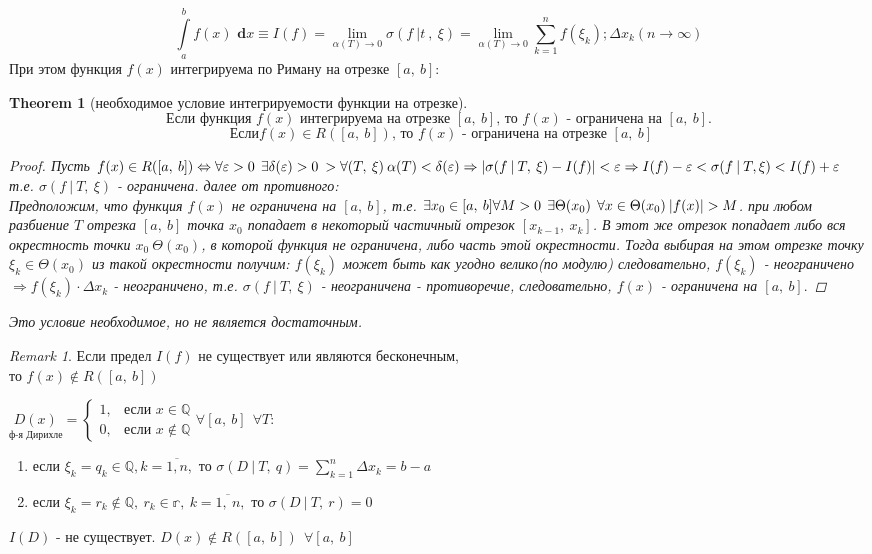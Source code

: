 \documentclass[a4paper,12pt, centered]{bookest}
\newtheorem{theorem}{Theorem}[section]
\theoremstyle{remark}
\newtheorem*{remark}{Remark}
\newcommand\dx{\textbf{ d}x}
\begin{document}
$$\int\limits_a^b f(x)\dx\equiv I(f)=\lim_{\alpha(T)\to0}\sigma(f\>|t\>,\>\xi)=\lim_{\alpha(T)\to0}\sum\limits_{k=1}^n f(\xi_k);\Delta x_k(n\to\infty)$$
При этом функция $f(x)$ интегрируема по Риману на отрезке $[a,\>b]:$
\begin{theorem}[необходимое условие интегрируемости функции на отрезке]
	$$\textrm{Если функция }f(x)\textrm{ интегрируема на отрезке }[a,\>b]\textrm{, то }f(x)\textrm{ - ограничена на }[a,\>b].$$
	$$\textrm{ Если}f(x)\in R([a,\>b])\textrm{, то }f(x)\textrm{ - ограничена на отрезке }[a,\>b]$$
	\begin{proof}
		Пусть $f(x)\in R([a,\>b])\Leftrightarrow\forall\varepsilon>0\>\>\exists\delta(\varepsilon)>0\>>\forall (T,\>\xi)\>\alpha (T)<\delta(\varepsilon)\Rightarrow|\sigma(f\>|\>T,\>\xi)-I(f)|<\varepsilon\Rightarrow I(f)-\varepsilon <\sigma(f\>|\>T,\xi)<I(f)+\varepsilon \\$ т.е. $\sigma(f\>|\>T,\>\xi)$ - ограничена. далее от противного: \\ Предположим, что функция $f(x)$ не ограничена на $[a,\>b]$, т.е. $\exists x_0\in[a,\>b]\\\forall M>0\>\>\exists\Theta(x_0)\>\>\forall x\in\Theta(x_0)\>|f(x)|>M$. при любом разбиение $T$ отрезка $[a,\>b]$ точка $x_0$ попадает в некоторый частичный отрезок $[x_{k-1},\>x_k]$. В этот же отрезок попадает либо вся окрестность точки $x_0\>\Theta(x_0)$, в которой функция не ограничена, либо часть этой окрестности. Тогда выбирая на этом отрезке точку $\xi_k\in\Theta(x_0)$  из такой окрестности получим: $f(\xi_k)$ может быть как угодно велико(по модулю) следовательно, $f(\xi_k)$ - неограничено $\Rightarrow f(\xi_k)\cdot\Delta x_k$ - неограничено, т.е. $\sigma(f\>|\>T,\>\xi)$ - неограничена - противоречие, следовательно, $f(x)$ - ограничена на $[a,\>b].$
	\end{proof}
	Это условие необходимое, но не является достаточным.
\end{theorem}
\begin{remark}
	Если предел $I(f)$ не существует или являются бесконечным, \\то $f(x)\not\in R([a,\>b])$
\end{remark}
\begin{example}
	$\underset{\textrm{ф-я Дирихле}}{D(x)}=\left\{\begin{array}{rl}
		1, & \textrm{если } x\in\mathbb{Q}\\
		0, & \textrm{если } x\not\in\mathbb{Q}
	\end{array}\right.$\newpage $\forall [a,\>b]\>\>\forall T:$\begin{enumerate}
		\item если $\xi_k=q_k\in\mathbb{Q},k=\overline{1,n},$ то $\sigma(D\>|\>T,\>q)=\sum\limits_{k=1}^n\Delta x_k=b-a$
		\item если $\xi_k=r_k\not\in\mathbb{Q},\>r_k\in\mathbb{r},\>k=\overline{1,\>n},$ то $\sigma(D\>|\>T,\>r)=0$
	\end{enumerate}
	$I(D)$ - не существует. $D(x)\not\in R([a,\>b])\>\>\forall [a,\>b]$
\end{example}
\end{document}
